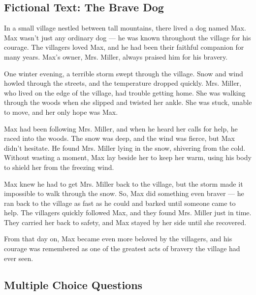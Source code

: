 \documentclass[12pt]{article}
\begin{document}
\onehalfspacing

\subsection*{Fictional Text: The Brave Dog}

\begin{tcolorbox}[colframe=black!40, colback=gray!5]

\begin{spacing}{1.15}

In a small village nestled between tall mountains, there lived a dog named Max. Max wasn’t just any ordinary dog — he was known throughout the village for his courage. The villagers loved Max, and he had been their faithful companion for many years. Max’s owner, Mrs. Miller, always praised him for his bravery.

One winter evening, a terrible storm swept through the village. Snow and wind howled through the streets, and the temperature dropped quickly. Mrs. Miller, who lived on the edge of the village, had trouble getting home. She was walking through the woods when she slipped and twisted her ankle. She was stuck, unable to move, and her only hope was Max.

Max had been following Mrs. Miller, and when he heard her calls for help, he raced into the woods. The snow was deep, and the wind was fierce, but Max didn’t hesitate. He found Mrs. Miller lying in the snow, shivering from the cold. Without wasting a moment, Max lay beside her to keep her warm, using his body to shield her from the freezing wind.

Max knew he had to get Mrs. Miller back to the village, but the storm made it impossible to walk through the snow. So, Max did something even braver — he ran back to the village as fast as he could and barked until someone came to help. The villagers quickly followed Max, and they found Mrs. Miller just in time. They carried her back to safety, and Max stayed by her side until she recovered.

From that day on, Max became even more beloved by the villagers, and his courage was remembered as one of the greatest acts of bravery the village had ever seen.

\end{spacing}

\end{tcolorbox}

\subsection*{Multiple Choice Questions}
\end{document}
